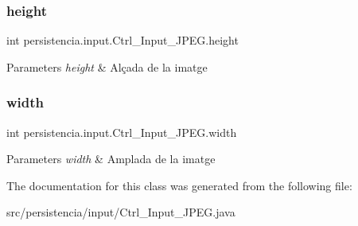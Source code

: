\subsubsection{\texorpdfstring{height}{height}}
{\footnotesize\ttfamily int persistencia.\+input.\+Ctrl\+\_\+\+Input\+\_\+\+J\+P\+E\+G.\+height\hspace{0.3cm}{\ttfamily [package]}}


\begin{DoxyParams}{Parameters}
{\em height} & Alçada de la imatge \\
\hline
\end{DoxyParams}
\mbox{\label{classpersistencia_1_1input_1_1Ctrl__Input__JPEG_a07d902b25b54941dc0444398c7d380e7}} 
\subsubsection{\texorpdfstring{width}{width}}
{\footnotesize\ttfamily int persistencia.\+input.\+Ctrl\+\_\+\+Input\+\_\+\+J\+P\+E\+G.\+width\hspace{0.3cm}{\ttfamily [package]}}


\begin{DoxyParams}{Parameters}
{\em width} & Amplada de la imatge \\
\hline
\end{DoxyParams}


The documentation for this class was generated from the following file\+:\begin{DoxyCompactItemize}
\item 
src/persistencia/input/Ctrl\+\_\+\+Input\+\_\+\+J\+P\+E\+G.\+java\end{DoxyCompactItemize}
